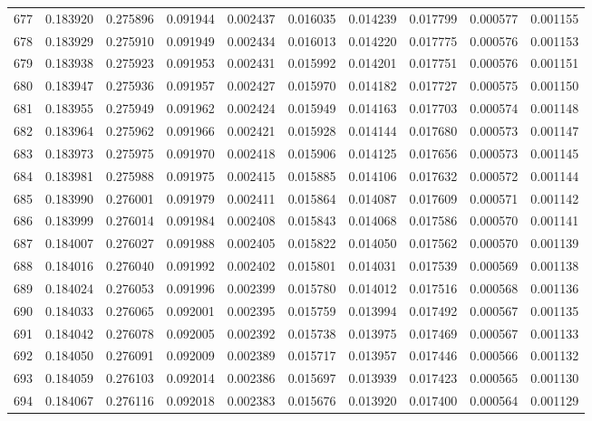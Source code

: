 \begin{tabular}{lrrrrrrrrr}
677 & 0.183920 & 0.275896 & 0.091944 & 0.002437 & 0.016035 & 0.014239 & 0.017799 & 0.000577 & 0.001155 \\
678 & 0.183929 & 0.275910 & 0.091949 & 0.002434 & 0.016013 & 0.014220 & 0.017775 & 0.000576 & 0.001153 \\
679 & 0.183938 & 0.275923 & 0.091953 & 0.002431 & 0.015992 & 0.014201 & 0.017751 & 0.000576 & 0.001151 \\
680 & 0.183947 & 0.275936 & 0.091957 & 0.002427 & 0.015970 & 0.014182 & 0.017727 & 0.000575 & 0.001150 \\
681 & 0.183955 & 0.275949 & 0.091962 & 0.002424 & 0.015949 & 0.014163 & 0.017703 & 0.000574 & 0.001148 \\
682 & 0.183964 & 0.275962 & 0.091966 & 0.002421 & 0.015928 & 0.014144 & 0.017680 & 0.000573 & 0.001147 \\
683 & 0.183973 & 0.275975 & 0.091970 & 0.002418 & 0.015906 & 0.014125 & 0.017656 & 0.000573 & 0.001145 \\
684 & 0.183981 & 0.275988 & 0.091975 & 0.002415 & 0.015885 & 0.014106 & 0.017632 & 0.000572 & 0.001144 \\
685 & 0.183990 & 0.276001 & 0.091979 & 0.002411 & 0.015864 & 0.014087 & 0.017609 & 0.000571 & 0.001142 \\
686 & 0.183999 & 0.276014 & 0.091984 & 0.002408 & 0.015843 & 0.014068 & 0.017586 & 0.000570 & 0.001141 \\
687 & 0.184007 & 0.276027 & 0.091988 & 0.002405 & 0.015822 & 0.014050 & 0.017562 & 0.000570 & 0.001139 \\
688 & 0.184016 & 0.276040 & 0.091992 & 0.002402 & 0.015801 & 0.014031 & 0.017539 & 0.000569 & 0.001138 \\
689 & 0.184024 & 0.276053 & 0.091996 & 0.002399 & 0.015780 & 0.014012 & 0.017516 & 0.000568 & 0.001136 \\
690 & 0.184033 & 0.276065 & 0.092001 & 0.002395 & 0.015759 & 0.013994 & 0.017492 & 0.000567 & 0.001135 \\
691 & 0.184042 & 0.276078 & 0.092005 & 0.002392 & 0.015738 & 0.013975 & 0.017469 & 0.000567 & 0.001133 \\
692 & 0.184050 & 0.276091 & 0.092009 & 0.002389 & 0.015717 & 0.013957 & 0.017446 & 0.000566 & 0.001132 \\
693 & 0.184059 & 0.276103 & 0.092014 & 0.002386 & 0.015697 & 0.013939 & 0.017423 & 0.000565 & 0.001130 \\
694 & 0.184067 & 0.276116 & 0.092018 & 0.002383 & 0.015676 & 0.013920 & 0.017400 & 0.000564 & 0.001129 \\

\end{tabular}
